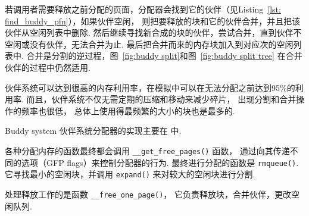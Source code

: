 若调用者需要释放之前分配的页面，分配器会找到它的伙伴（见Listing~\ref{lst: find_buddy_pfn}），如果伙伴空闲，
则把要释放的块和它的伙伴合并，并且把该伙伴从空闲列表中删除.
然后继续寻找新合成的块的伙伴，尝试合并，直到伙伴不空闲或没有伙伴，无法合并为止.
最后把合并而来的内存块加入到对应次的空闲列表中.
合并是分割的逆过程，图~\ref{fig:buddy split}和图~\ref{fig:buddy split tree}
在合并伙伴的过程中仍然适用.

伙伴系统可以达到很高的内存利用率，在模拟中可以在无法分配之前达到95\%的利用率.
而且，伙伴系统不仅无需定期的压缩和移动来减少碎片，
出现分割和合并操作的频率也很低，
总体上使用得最频繁的大小的块也是最多的.\cite{taocp1}

\begin{readsrcbox}{Buddy system}
	伙伴系统分配器的实现主要在  中.

	各种分配内存的函数最终都会调用 \lstinline{__get_free_pages()} 函数，
	通过向其传递不同的选项（GFP flags）来控制分配器的行为.
	最终进行分配的函数是 \lstinline{rmqueue()}.
	它寻找最小的空闲块，并调用 \lstinline{expand()} 来对较大的空闲块进行分割.

	处理释放工作的是函数 \lstinline{__free_one_page()}，
	它负责释放块，合并伙伴，更改空闲队列.
\end{readsrcbox}

